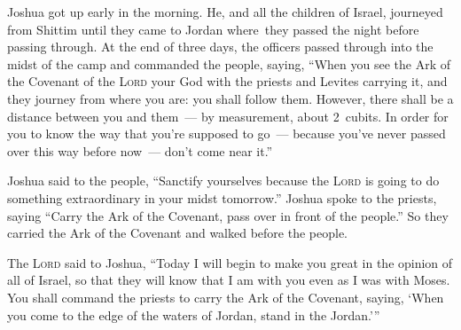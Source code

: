 
\begin{inparaenum}
   Joshua got up early in the morning. He, and all the children of Israel, journeyed from Shittim until they came to Jordan where\understood\ they passed the night before passing through.%
   At the end of three days, the officers passed through into the midst of the camp%
   and commanded the people, saying, ``When you see the Ark of the Covenant of the \textsc{Lord} your God with the priests and Levites carrying it, and they journey from where you are: you shall follow them.%
   However, there shall be a distance between you and them~--- by measurement, about 2~cu\-bits. In order for you to know the way that you're supposed to go~--- because you've never passed over this way before now~--- don't come near it.''%
  
   Joshua said to the people, ``Sanctify yourselves because the \textsc{Lord} is going to do something extraordinary in your midst tomorrow.''%
   Joshua spoke to the priests, saying ``Carry the Ark of the Covenant, pass over in front of the people.'' So they carried the Ark of the Covenant and walked before the people.%
  
   The \textsc{Lord} said to Joshua, ``Today I will begin to make you great in the opinion of all of Israel, so that they will know that I am with you even as I was with Moses.%
   You shall command the priests to carry the Ark of the Covenant, saying, `When you come to the edge of the waters of Jordan, stand in the Jordan.'\thinspace''%
  

\end{inparaenum}

